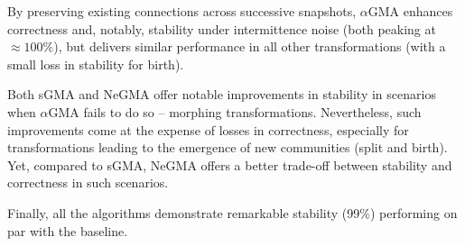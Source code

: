 \documentclass[letterpaper]{article}
\begin{document}
By preserving existing connections across successive snapshots, $\alpha$GMA enhances correctness and, notably, stability under intermittence noise (both peaking at $\approx 100\%$), but delivers similar performance in all other transformations (with a small loss in stability for birth). 

Both sGMA and NeGMA offer notable improvements in stability in scenarios when $\alpha$GMA fails to do so -- \ie morphing transformations. Nevertheless, such improvements come at the expense of losses in correctness, especially for transformations leading to the emergence of new communities (\ie split and birth). Yet, compared to sGMA, NeGMA offers a better trade-off between stability and correctness in such scenarios. 

Finally, all the algorithms demonstrate remarkable stability (99\%) performing on par with the baseline.
\end{document}
